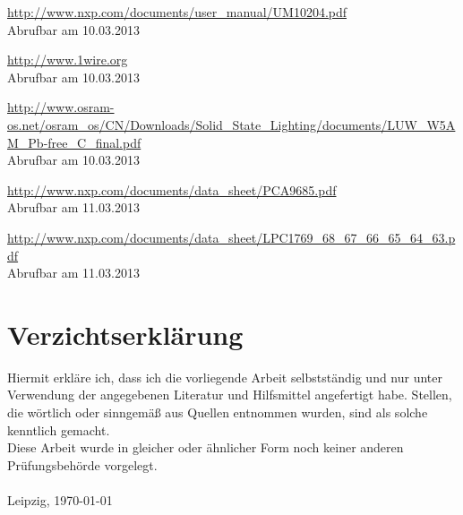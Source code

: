 \documentclass[a4paper,12pt]{scrartcl}
\begin{document}
\renewcommand\refname{Quellenverzeichnis}
\begin{thebibliography}{999}

\url{http://www.nxp.com/documents/user_manual/UM10204.pdf}
\\Abrufbar am 10.03.2013

\url{http://www.1wire.org}
\\Abrufbar am 10.03.2013

\url{http://www.osram-os.net/osram_os/CN/Downloads/Solid_State_Lighting/documents/LUW_W5AM_Pb-free_C_final.pdf}
\\Abrufbar am 10.03.2013

\url{http://www.nxp.com/documents/data_sheet/PCA9685.pdf}
\\Abrufbar am 11.03.2013

\url{http://www.nxp.com/documents/data_sheet/LPC1769_68_67_66_65_64_63.pdf}
\\Abrufbar am 11.03.2013\end{thebibliography}

\clearpage
\section{Verzichtserkl\"arung}
\thispagestyle{plain}

Hiermit erkläre ich, dass ich die vorliegende Arbeit selbstständig und nur unter Verwendung der angegebenen Literatur und Hilfsmittel angefertigt habe.
Stellen, die wörtlich oder sinngemäß aus Quellen entnommen wurden, sind als solche
kenntlich gemacht.\\

Diese Arbeit wurde in gleicher oder ähnlicher Form noch keiner anderen Prüfungsbehörde vorgelegt.\\\\

Leipzig, \today
\end{document}
